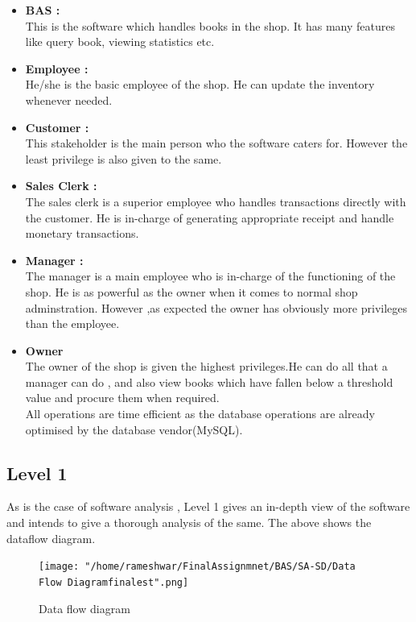 \documentclass{scrreprt}
\begin{document}
\begin{itemize}
\item \textbf{BAS :} \\
This is the software which handles books in the shop. It has many features like query book, viewing statistics etc.

\item \textbf{Employee :}\\
He/she is the basic employee of the shop. He can update the inventory whenever needed.

\item \textbf{Customer :} \\
This stakeholder is the main person who the software caters for. However the least privilege is also given to the same.

\item \textbf{Sales Clerk :}\\
The sales clerk is a superior employee who handles transactions directly with the customer. He is in-charge of generating appropriate receipt and handle monetary transactions.

\item \textbf{Manager :} \\
The manager is a main employee who is in-charge of the functioning of the shop. He is as powerful as the owner when it comes to normal shop adminstration. However ,as expected the owner has obviously more privileges than the employee.

\item \textbf{Owner} \\
The owner of the shop is given the highest privileges.He can do all that a manager can do , and also view books which have fallen below a threshold value and procure them when required. \\

All operations are time efficient as the database operations are already optimised by the database vendor(MySQL).
\end{itemize}
\clearpage
\subsection{Level 1}
As is the case of software analysis , Level 1 gives an in-depth view of the software and intends to give a thorough analysis of the same. The above shows the dataflow diagram. 


\begin{figure}
\texttt{[image: "/home/rameshwar/FinalAssignmnet/BAS/SA-SD/Data Flow Diagramfinalest".png]}
\caption{Data flow diagram}
\end{figure}
\end{document}
